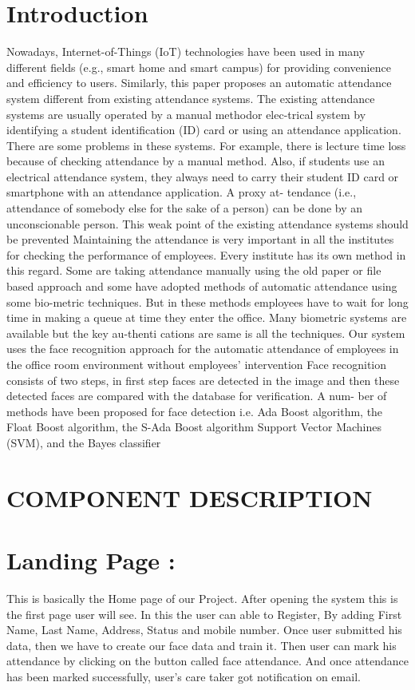 \section{Introduction}
Nowadays, Internet-of-Things (IoT) technologies have been used in many different fields (e.g., smart home and smart
campus) for providing convenience and efficiency to users. Similarly, this paper proposes an automatic attendance system
different from existing attendance systems. The existing attendance systems are usually operated by a manual methodor
elec-trical system by identifying a student identification (ID) card or using an attendance application. There are some
problems in these systems.
For example, there is lecture time loss because of checking attendance by a manual method.
Also, if students use an electrical attendance system, they always need to carry their student ID card or smartphone with
an attendance application. A proxy at- tendance (i.e., attendance of somebody else for the sake of a person) can be done
by an unconscionable person. This weak point of the existing attendance systems should be prevented
Maintaining the attendance is very important in all the institutes for checking the performance of employees. Every
institute has its own method in this regard. Some are taking attendance manually using the old paper or file based approach
and some have adopted methods of automatic attendance using some bio-metric techniques.
But in these methods employees have to wait for long time in making a queue at time they enter the office. Many biometric systems are available but the key au-thenti cations are same is all the techniques.
Our system uses the face recognition approach for the automatic attendance of employees in the office room environment
without employees’ intervention Face recognition consists of two steps, in first step faces are detected in the image and
then these detected faces are compared with the database for verification. A num- ber of methods have been proposed for
face detection i.e. Ada Boost algorithm, the Float Boost algorithm, the S-Ada Boost algorithm Support Vector Machines
(SVM), and the Bayes classifier
\section{COMPONENT DESCRIPTION
}
\section{Landing Page :}
This is basically the Home page of our Project. After opening the system this is the first page user will see. In this the
user can able to Register, By adding First Name, Last Name, Address, Status and mobile number. Once user submitted
his data, then we have to create our face data and train it. Then user can mark his attendance by clicking on the button
called face attendance.
And once attendance has been marked successfully, user’s care taker got notification on email.

